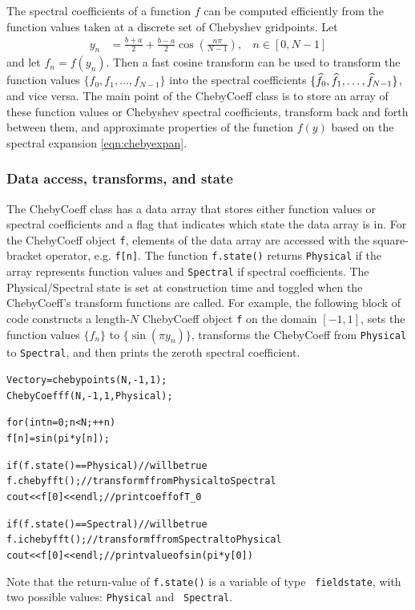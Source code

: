 \documentclass{article}[12pt]
\begin{document}
The spectral coefficients of a function $f$ can be computed
efficiently from the function values taken at a discrete set of
Chebyshev gridpoints. Let
\begin{align}
y_n &= \frac{b+a}{2} + \frac{b-a}{2} \cos\left(\frac{n \pi}{N-1}\right),
\:\:\:\: n \in [0, N-1]
\end{align}
and let $f_n = f(y_n)$. Then a fast cosine transform can be used to
transform the function values $\{f_0, f_1, \ldots, f_{N-1}\}$ into the
spectral coefficients $\{\widehat{f}_0, \widehat{f}_1, \ldots, \widehat{f}_{N-1}\}$, and vice
versa. The main point of the ChebyCoeff class is to store an array of
these function values or Chebyshev spectral coefficients, transform
back and forth between them, and approximate properties of the function
$f(y)$ based on the spectral expansion \ref{eqn:chebyexpan}.

\subsubsection{Data access, transforms, and state}

The ChebyCoeff class has a data array that stores either function
values or spectral coefficients and a flag that indicates which state
the data array is in. For the ChebyCoeff object {\tt f}, elements of
the data array are accessed with the square-bracket operator, e.g.
{\tt f[n]}. The function {\tt f.state()} returns {\tt Physical} if the
array represents function values and {\tt Spectral} if spectral
coefficients. The Physical/Spectral state is set at construction time
and toggled when the ChebyCoeff's transform functions are called. For
example, the following block of code constructs a length-$N$
ChebyCoeff object {\tt f} on the domain $[-1,1]$, sets the function
values $\{f_n\}$ to $\{\sin(\pi y_n)\}$, transforms the ChebyCoeff from
{\tt Physical} to {\tt Spectral}, and then prints the zeroth spectral
coefficient.
\begin{alltt}
  Vector y = chebypoints(N,-1,1);
  ChebyCoeff f(N,-1,1,Physical);

  for (int n=0; n<N; ++n)
    f[n] = sin(pi*y[n]);

  if (f.state() == Physical)  // will be true
    f.chebyfft();             // transform f from Physical to Spectral
  cout << f[0] << endl;       // print coeff of T_0

  if (f.state() == Spectral)  // will be true
    f.ichebyfft();            // transform f from Spectral to Physical
  cout << f[0] << endl;       // print value of sin(pi*y[0])
\end{alltt}
Note that the return-value of {\tt f.state()} is a variable of type {\tt
fieldstate}, with two possible values: {\tt Physical} and {\tt
Spectral}.
\end{document}
